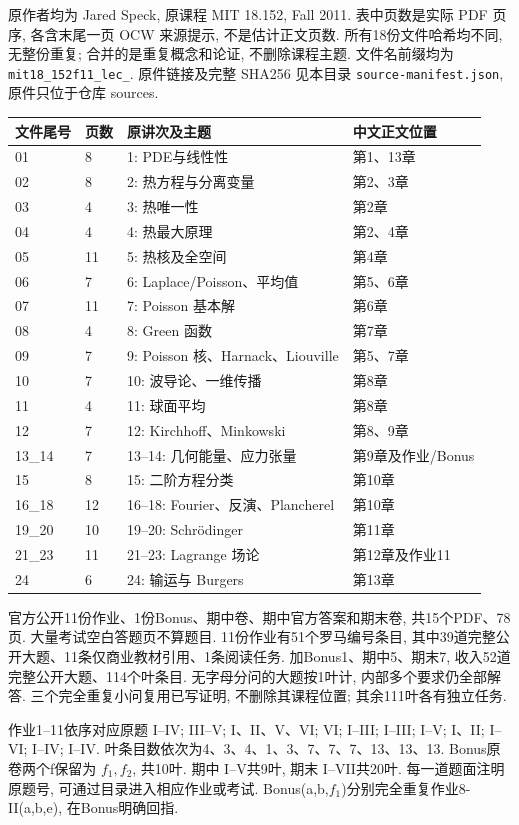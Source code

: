 原作者均为 Jared Speck, 原课程 MIT 18.152, Fall 2011. 表中页数是实际 PDF 页序, 各含末尾一页 OCW 来源提示, 不是估计正文页数. 所有18份文件哈希均不同, 无整份重复; 合并的是重复概念和论证, 不删除课程主题. 文件名前缀均为 \texttt{mit18\_152f11\_lec\_}. 原件链接及完整 SHA256 见本目录 \texttt{source-manifest.json}, 原件只位于仓库 sources.
\begin{longtable}{p{}p{}p{}p{}}
\toprule 文件尾号&页数&原讲次及主题&中文正文位置\\\midrule\endhead
01&8&1: PDE与线性性&第1、13章\\
02&8&2: 热方程与分离变量&第2、3章\\
03&4&3: 热唯一性&第2章\\
04&4&4: 热最大原理&第2、4章\\
05&11&5: 热核及全空间&第4章\\
06&7&6: Laplace/Poisson、平均值&第5、6章\\
07&11&7: Poisson 基本解&第6章\\
08&4&8: Green 函数&第7章\\
09&7&9: Poisson 核、Harnack、Liouville&第5、7章\\
10&7&10: 波导论、一维传播&第8章\\
11&4&11: 球面平均&第8章\\
12&7&12: Kirchhoff、Minkowski&第8、9章\\
13\_14&7&13--14: 几何能量、应力张量&第9章及作业/Bonus\\
15&8&15: 二阶方程分类&第10章\\
16\_18&12&16--18: Fourier、反演、Plancherel&第10章\\
19\_20&10&19--20: Schrödinger&第11章\\
21\_23&11&21--23: Lagrange 场论&第12章及作业11\\
24&6&24: 输运与 Burgers&第13章\\\bottomrule
\end{longtable}
官方公开11份作业、1份Bonus、期中卷、期中官方答案和期末卷, 共15个PDF、78页. 大量考试空白答题页不算题目. 11份作业有51个罗马编号条目, 其中39道完整公开大题、11条仅商业教材引用、1条阅读任务. 加Bonus1、期中5、期末7, 收入52道完整公开大题、114个叶条目. 无字母分问的大题按1叶计, 内部多个要求仍全部解答. 三个完全重复小问复用已写证明, 不删除其课程位置; 其余111叶各有独立任务.

作业1--11依序对应原题 I--IV; III--V; I、II、V、VI; VI; I--III; I--III; I--V; I、II; I--VI; I--IV; I--IV. 叶条目数依次为4、3、4、1、3、7、7、7、13、13、13. Bonus原卷两个f保留为 $f_1,f_2$, 共10叶. 期中 I--V共9叶, 期末 I--VII共20叶. 每一道题面注明原题号, 可通过目录进入相应作业或考试. Bonus(a,b,$f_1$)分别完全重复作业8-II(a,b,e), 在Bonus明确回指.


